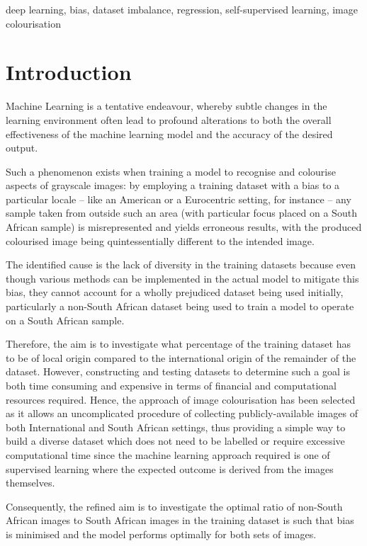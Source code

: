 \documentclass[conference]{IEEEtran}
\begin{document}
\begin{IEEEkeywords}
deep learning, bias, dataset imbalance, regression, self-supervised learning, image colourisation
\end{IEEEkeywords}

\section{Introduction}

Machine Learning is a tentative endeavour, whereby subtle changes in the learning environment often lead to profound alterations to both the overall effectiveness of the machine learning model and the accuracy of the desired output. 

Such a phenomenon exists when training a model to recognise and colourise aspects of grayscale images: by employing a training dataset with a bias to a particular locale – like an American or a Eurocentric setting, for instance – any sample taken from outside such an area (with particular focus placed on a South African sample) is misrepresented and yields erroneous results, with the produced colourised image being quintessentially different to the intended image.

The identified cause is the lack of diversity in the training datasets because even though various methods can be implemented in the actual model to mitigate this bias, they cannot account for a wholly prejudiced dataset being used initially, particularly a non-South African dataset being used to train a model to operate on a South African sample. 

Therefore, the aim is to investigate what percentage of the training dataset has to be of local origin compared to the international origin of the remainder of the dataset. However, constructing and testing datasets to determine such a goal is both time consuming and expensive in terms of financial and computational resources required. Hence, the approach of image colourisation has been selected as it allows an uncomplicated procedure of collecting publicly-available images of both International and South African settings, thus providing a simple way to build a diverse dataset which does not need to be labelled or require excessive computational time since the machine learning approach required is one of supervised learning where the expected outcome is derived from the images themselves.

Consequently, the refined aim is to investigate the optimal ratio of non-South African images to South African images in the training dataset is such that bias is minimised and the model performs optimally for both sets of images.
\end{document}
